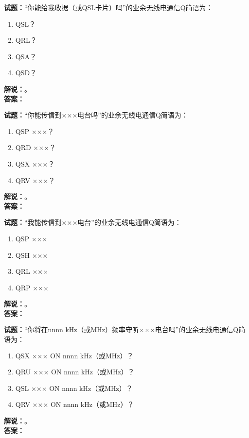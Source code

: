 \documentclass{ctexbook}
\begin{document}
\bigskip




\noindent\textbf{试题：}“你能给我收据（或QSL卡片）吗”的业余无线电通信Q简语为：
\begin{enumerate}[leftmargin=3em]
\item QSL？
\item QRL？
\item QSA？
\item QSD？
\end{enumerate}
\noindent\textbf{解说：}\textbf{}。\\\noindent\textbf{答案：}

\bigskip




\noindent\textbf{试题：}“你能传信到×××电台吗”的业余无线电通信Q简语为：
\begin{enumerate}[leftmargin=3em]
\item QSP ×××？
\item QRD ×××？
\item QSX ×××？
\item QRV ×××？
\end{enumerate}
\noindent\textbf{解说：}\textbf{}。\\\noindent\textbf{答案：}

\bigskip




\noindent\textbf{试题：}“我能传信到×××电台”的业余无线电通信Q简语为：
\begin{enumerate}[leftmargin=3em]
\item QSP ×××
\item QSH ×××
\item QRL ×××
\item QRP ×××
\end{enumerate}
\noindent\textbf{解说：}\textbf{}。\\\noindent\textbf{答案：}

\bigskip




\noindent\textbf{试题：}“你将在nnnn \si{\kHz}（或\unit{\MHz}）频率守听×××电台吗”的业余无线电通信Q简语为：
\begin{enumerate}[leftmargin=3em]
\item QSX ××× ON nnnn \si{\kHz}（或\unit{\MHz}）？
\item QRU ××× ON nnnn \si{\kHz}（或\unit{\MHz}）？
\item QSL ××× ON nnnn \si{\kHz}（或\unit{\MHz}）？
\item QRV ××× ON nnnn \si{\kHz}（或\unit{\MHz}）？
\end{enumerate}
\noindent\textbf{解说：}\textbf{}。\\\noindent\textbf{答案：}
\end{document}
